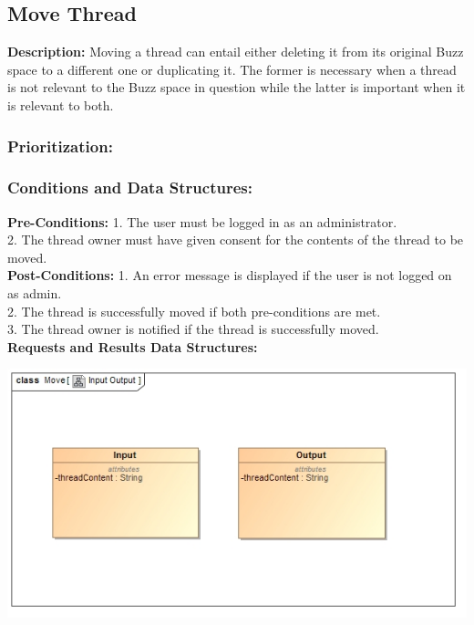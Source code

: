 \documentclass[a4paper,11pt]{article}
\begin{document}
\subsection{Move Thread}
\textbf{Description:}
Moving a thread can entail either deleting it from its original Buzz space to a different one or duplicating it. The former is necessary when a thread is not relevant to the Buzz space in question while the latter is important when it is relevant to both.\\
\subsubsection{Prioritization:} 
\subsubsection{Conditions and Data Structures:}
\textbf{Pre-Conditions:}
1.	The user must be logged in as an administrator.\\
2.	The thread owner must have given consent for the contents of the thread to be moved.\\
\textbf{Post-Conditions:}
1.	An error message is displayed if the user is not logged on as admin.\\
2.	The thread is successfully moved if both pre-conditions are met.\\
3.	The thread owner is notified if the thread is successfully moved.\\
\textbf{Requests and Results Data Structures:}
\begin{center}
\includegraphics[width=0.7\linewidth]{Images/SCHMThread/MoveInOut.jpg}\\
\end{center}
\end{document}
